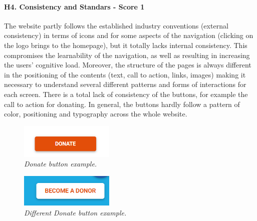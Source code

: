 \paragraph*{H4. Consistency and Standars - Score 1}
The website partly follows the established industry conventions (external consistency) in terms of icons and for some aspects of the navigation (clicking on the logo brings to the homepage), but it totally lacks internal consistency. This compromises the learnability of the navigation, as well as resulting in increasing the users’ cognitive load. Moreover, the structure of the pages is always different in the positioning of the contents (text, call to action, links, images) making it necessary to understand several different patterns and forms of interactions for each screen.
There is a total lack of consistency of the buttons, for example the call to action for donating. In general, the buttons hardly follow a pattern of color, positioning and typography across the whole website.

\begin{figure}[h]
	\centering
	\begin{center}
		\includegraphics[width=0.4\textwidth]{Picture6.png}
	\end{center}
	\captionsetup{font=small}
	\caption{\textit{Donate button example.}}
	\label{fig:label6}
\end{figure}

\begin{figure}[h]
	\centering
	\begin{center}
		\includegraphics[width=0.4\textwidth]{Picture7.png}
	\end{center}
	\captionsetup{font=small}
	\caption{\textit{Different Donate button example.}}
	\label{fig:label7}
\end{figure}

